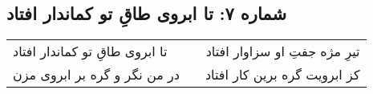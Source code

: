 \begin{center}
\section*{شماره ۷: تا ابروی طاقِ تو کماندار افتاد}
\label{sec:007}
\begin{longtable}{l p{0.5cm} r}
تا ابروی طاقِ تو کماندار افتاد
&&
تیرِ مژه جفتِ او سزاوار افتاد
\\
در من نگر و گره بر ابروی مزن
&&
کز ابرویت گره برین کار افتاد
\\
\end{longtable}
\end{center}
